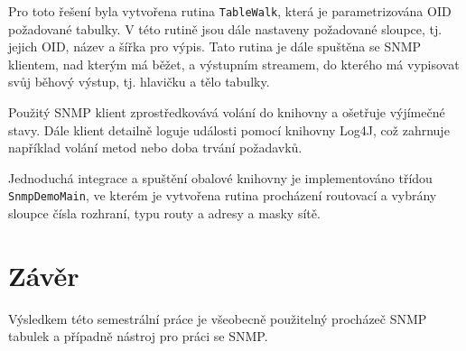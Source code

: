 \documentclass[12pt,a4paper]{article}
\let\oldsection\section
\renewcommand\section{\clearpage\oldsection}
\begin{document}
Pro toto řešení byla vytvořena rutina \texttt{TableWalk}, která je parametrizována OID požadované tabulky.
V této rutině jsou dále nastaveny požadované sloupce, tj. jejich OID, název a šířka pro výpis.
Tato rutina je dále spuštěna se SNMP klientem, nad kterým má běžet, a výstupním streamem, do kterého má vypisovat svůj běhový výstup, tj. hlavičku a tělo tabulky.

Použitý SNMP klient zprostředkovává volání do knihovny a ošetřuje výjímečné stavy. Dále klient detailně loguje události pomocí knihovny Log4J, což zahrnuje například volání metod nebo doba trvání požadavků.

Jednoduchá integrace a spuštění obalové knihovny je implementováno třídou \texttt{SnmpDemoMain}, ve kterém je vytvořena rutina procházení routovací a vybrány sloupce čísla rozhraní, typu routy a adresy a masky sítě.

\section{Závěr}
Výsledkem této semestrální práce je všeobecně použitelný procházeč SNMP tabulek a případně nástroj pro práci se SNMP.


\end{document}
